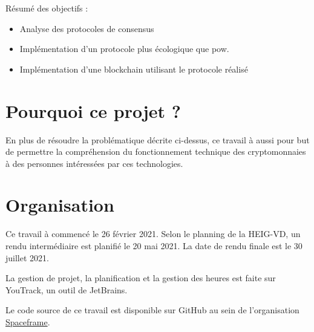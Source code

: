 Résumé des objectifs :
\begin{itemize}
    \item Analyse des protocoles de consensus
    \item Implémentation d'un protocole plus écologique que \gls{pow}.
    \item Implémentation d'une blockchain utilisant le protocole réalisé
\end{itemize}

\section{Pourquoi ce projet ?}

En plus de résoudre la problématique décrite ci-dessus, ce travail à aussi pour but de permettre la compréhension du fonctionnement technique des cryptomonnaies à des personnes intéressées par ces technologies.

\section{Organisation}

Ce travail à commencé le 26 février 2021.
Selon le planning de la HEIG-VD, un rendu intermédiaire est planifié le 20 mai 2021. La date de rendu finale est le 30 juillet 2021.

La gestion de projet, la planification et la gestion des heures est faite sur YouTrack, un outil de JetBrains.

Le code source de ce travail est disponible sur GitHub au sein de l'organisation \href{https://github.com/spaceframeos}{Spaceframe}.